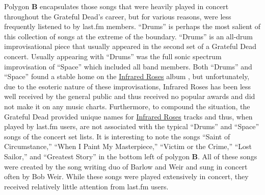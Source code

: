 \documentclass{svmult}
\newcommand{\ttt}[1]{``#1''}
\newcommand{\album}[1]{\uline{#1}}
\begin{document}
Polygon {\bf B} encapsulates those songs that were heavily played in concert throughout the Grateful Dead's career, but for various reasons, were less frequently listened to by last.fm members. \ttt{Drums} is perhaps the most salient of this collection of songs at the extreme of the boundary. \ttt{Drums} is an all-drum improvisational piece that usually appeared in the second set of a Grateful Dead concert. Usually appearing with \ttt{Drums} was the full sonic spectrum improvisation of \ttt{Space} which included all band members. Both \ttt{Drums} and \ttt{Space} found a stable home on the \album{Infrared Roses} album \cite{infrared:dead1991}, but unfortunately, due to the esoteric nature of these improvisations, Infrared Roses has been less well received by the general public and thus received no popular awards and did not make it on any music charts. Furthermore, to compound the situation, the Grateful Dead provided unique names for \album{Infrared Roses} tracks and thus, when played by last.fm users, are not associated with the typical \ttt{Drums} and \ttt{Space} songs of the concert set lists. It is interesting to note the songs \ttt{Saint of Circumstance,} \ttt{When I Paint My Masterpiece,} \ttt{Victim or the Crime,} \ttt{Lost Sailor,} and \ttt{Greatest Story} in the bottom left of polygon {\bf B}. All of these songs were created by the song writing duo of Barlow and Weir and sung in concert often by Bob Weir. While these songs were played extensively in concert, they received relatively little attention from last.fm users. 
\end{document}
